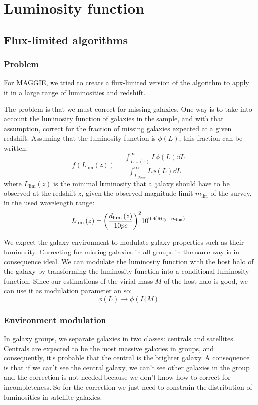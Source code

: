 \chapter{Luminosity function}
%
\section{Flux-limited algorithms}
%
\subsection{Problem}
%
For MAGGIE, we tried to create a flux-limited version of the algorithm to
apply it in a large range of luminosities and redshift.

The problem is that we must correct for missing galaxies. One way is to take
into account the luminosity function of galaxies in the sample, and with
that assumption, correct for the fraction of missing galaxies expected at a
given redshift. Assuming that the luminosity function is
$\phi\left(L\right)$, this fraction can be written:
%
\begin{equation}\label{eq:correc}
    f\left({L_{\lim}{\left({z}\right)}}\right)=\frac{\int_{L_{\lim}\left({z}\right)}^{\infty}L\phi{\left({L}\right)}\dd{L}}{\int_{L_{thres}}^{\infty}L\phi{\left({L}\right)}\dd{L}}
\end{equation}
%
where $L_{\lim}\left({z}\right)$ is the minimal luminosity that a galaxy should
have to be observed at the redshift $z$, given the observed magnitude limit
$m_{\lim}$ of the survey, in the used wavelength range:
%
\begin{equation}
    L_{\lim}\left({z}\right)={{\left(\frac{d_{\rm{lum}}\left({z}\right)}{10pc}\right)}^2}10^{0.4\left({M_{\odot}-m_{\lim}}\right)}
\end{equation}
%

We expect the galaxy environment to modulate galaxy properties such as their
luminosity. Correcting for missing galaxies in all groups in the same way is
in consequence ideal. We can modulate the luminosity function with the host
halo of the galaxy by transforming the luminosity function into a
conditional luminosity function. Since our estimations of the virial mass
$M$ of the host halo is good, we can use it as modulation parameter an so:
%
\begin{equation}
    \phi\left({L}\right)\rightarrow\phi\left({L|M}\right)%
\end{equation}
%
\subsection{Environment modulation}
%
In galaxy groups, we separate galaxies in two classes: centrals and satellites.
Centrals are expected to be the most massive galaxies in groups, and
consequently, it's probable that the central is the brighter galaxy. A
consequence is that if we can't see the central galaxy, we can't see other
galaxies in the group and the correction is not needed because we don't know
how to correct for incompleteness. So for the correction we just need to
constrain the distribution of luminosities in satellite galaxies.

